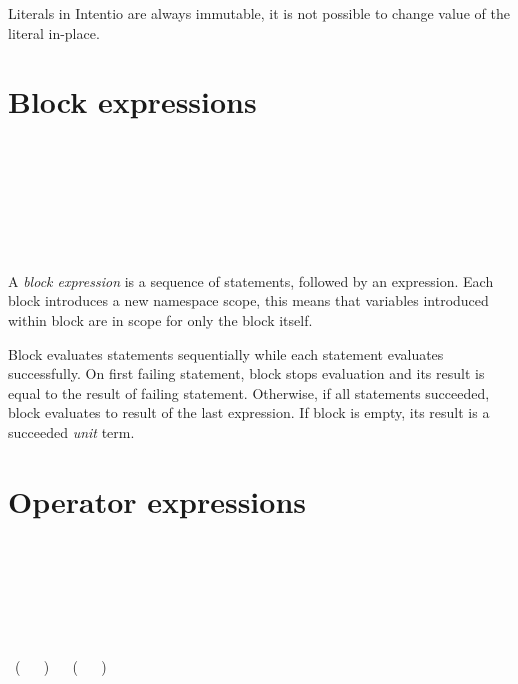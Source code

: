 Literals in Intentio are always immutable, it is not possible to change value of the literal in-place.

\section{Block expressions}

\begin{bnf}
   \eq {} \\
  \\
   \eq \term{\{} \  \ \term{\}} \\
   \eq \term{(} \  \ \term{)} \\
  \\
   \eq {} \  \ \gtry{\term{;}}
\end{bnf}

A \emph{block expression} is a sequence of statements, followed by an expression. Each block introduces a new namespace scope, this means that variables introduced within block are in scope for only the block itself.

Block evaluates statements sequentially while each statement evaluates successfully. On first failing statement, block stops evaluation and its result is equal to the result of failing statement. Otherwise, if all statements succeeded, block evaluates to result of the last expression. If block is empty, its result is a succeeded \emph{unit} term.

\section{Operator expressions}

\begin{bnf}
   \eq {} \gor {} \\
   \eq {} \gor {} \gor {} \\
  \\
   \eq \term{-} \  \\
   \eq {} \  \\
  \\
   \eq    {} \ ( \ \term{+} \gor \term{-} \ ) \ 
                 \gorln {} \ ( \ \term{*} \gor \term{/} \ ) \  \\
  \\
   \eq {} \  \  \\
     \eq \term{==} \gor \term{!=} \gor \term{<} \gor \term{>} \gor \term{<=} \gor \term{>=} \gor \term{===} \gor \term{!==} \\
  \\
   \eq    {} \  \ 
                \gorln {} \  \ 
\end{bnf}

